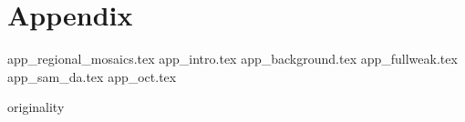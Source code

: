 \documentclass[
    10pt,
	colorful,
	boxey,
 a4paper,
]{tufte-style-thesis}
\begin{document}
\part*{Appendix}
\appendix

\setcounter{table}{0}
\setcounter{figure}{0}
\setcounter{section}{0}
\setcounter{chapter}{0}

\renewcommand{\thetable}{A\arabic{table}}  %
\renewcommand{\thefigure}{A\arabic{figure}}  %

{app_regional_mosaics.tex}
{app_intro.tex}
{app_background.tex}
{app_fullweak.tex}
{app_sam_da.tex}
{app_oct.tex}

\cleardoublepage


\thispagestyle{empty}
{originality}
\cleardoublepage

\end{document}

